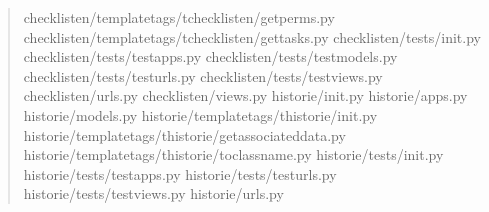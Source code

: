 \documentclass[letterpaper,10pt,english]{sphinxmanual}
\begin{document}
\begin{quote}
\begin{sphinxVerbatim}[commandchars=\\\{\}]
checklisten/templatetags/t\PYGZus{}checklisten/get\PYGZus{}perms.py                     \PYGZpc{}
checklisten/templatetags/t\PYGZus{}checklisten/get\PYGZus{}tasks.py                     \PYGZpc{}
checklisten/tests/\PYGZus{}\PYGZus{}init\PYGZus{}\PYGZus{}.py                                          \PYGZpc{}
checklisten/tests/test\PYGZus{}apps.py                                         \PYGZpc{}
checklisten/tests/test\PYGZus{}models.py                                      \PYGZpc{}
checklisten/tests/test\PYGZus{}urls.py                                        \PYGZpc{}
checklisten/tests/test\PYGZus{}views.py                                       \PYGZpc{}
checklisten/urls.py                                                    \PYGZpc{}
checklisten/views.py                                                  \PYGZpc{}
historie/\PYGZus{}\PYGZus{}init\PYGZus{}\PYGZus{}.py                                                   \PYGZpc{}
historie/apps.py                                                       \PYGZpc{}
historie/models.py                                                     \PYGZpc{}
historie/templatetags/t\PYGZus{}historie/\PYGZus{}\PYGZus{}init\PYGZus{}\PYGZus{}.py                           \PYGZpc{}
historie/templatetags/t\PYGZus{}historie/get\PYGZus{}associated\PYGZus{}data.py               \PYGZpc{}
historie/templatetags/t\PYGZus{}historie/to\PYGZus{}class\PYGZus{}name.py                      \PYGZpc{}
historie/tests/\PYGZus{}\PYGZus{}init\PYGZus{}\PYGZus{}.py                                             \PYGZpc{}
historie/tests/test\PYGZus{}apps.py                                            \PYGZpc{}
historie/tests/test\PYGZus{}urls.py                                            \PYGZpc{}
historie/tests/test\PYGZus{}views.py                                          \PYGZpc{}
historie/urls.py                                                       \PYGZpc{}

\end{sphinxVerbatim}
\end{quote}
\end{document}
